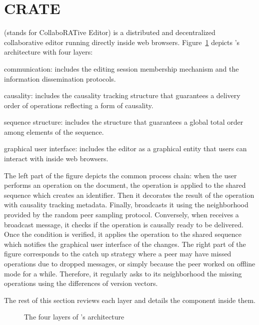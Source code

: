 
\section{CRATE}
\label{sec:proposal}

\CRATE (stands for CollaboRATive Editor) is a distributed and decentralized
collaborative editor running directly inside web browsers.   Figure~\ref{fig:architecture} depicts \CRATE's architecture
with four layers:
\begin{inparaenum}[(i)]
\item communication: includes the editing session membership mechanism and the
  information dissemination protocols.
\item causality: includes the causality tracking structure that guarantees a
  delivery order of operations reflecting a form of causality.
\item sequence structure: includes the structure that guarantees a global
  total order among elements of the sequence.
\item graphical user interface: includes the editor as a graphical entity that
  users can interact with inside web browsers.
\end{inparaenum}
The left part of the figure depicts the common process chain: when the user
performs an operation on the document, the operation is applied to the shared
sequence which creates an \LSEQ identifier. Then it decorates the result of the
operation with causality tracking metadata. Finally, \CRATE broadcasts it using
the neighborhood provided by the \SPRAY random peer sampling protocol.
Conversely, when \CRATE receives a broadcast message, it checks if the operation
is causally ready to be delivered. Once the condition is verified, it applies
the operation to the shared sequence which notifies the graphical user interface
of the changes.  The right part of the figure corresponds to the catch up
strategy where a peer may have missed operations due to dropped messages, or
simply because the peer worked on offline mode for a while. Therefore, it
regularly asks to its neighborhood the missing operations using the differences
of version vectors.

The rest of this section reviews each layer and details the component inside
them.

\begin{figure}
  \centering
  
  \caption{\label{fig:architecture}The four layers of \CRATE's architecture}
\end{figure}

